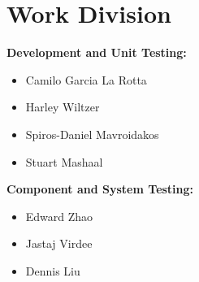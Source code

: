 \documentclass[10pt]{article}
\begin{document}
\section*{Work Division}
\textbf{Development and Unit Testing:}
	\begin{itemize}
    \item Camilo Garcia La Rotta
    \item Harley Wiltzer
    \item Spiros-Daniel Mavroidakos
    \item Stuart Mashaal
	\end{itemize}

\noindent \textbf{Component and System Testing:}
	\begin{itemize}
    \item Edward Zhao
    \item Jastaj Virdee
    \item Dennis Liu
	\end{itemize}
\end{document}
